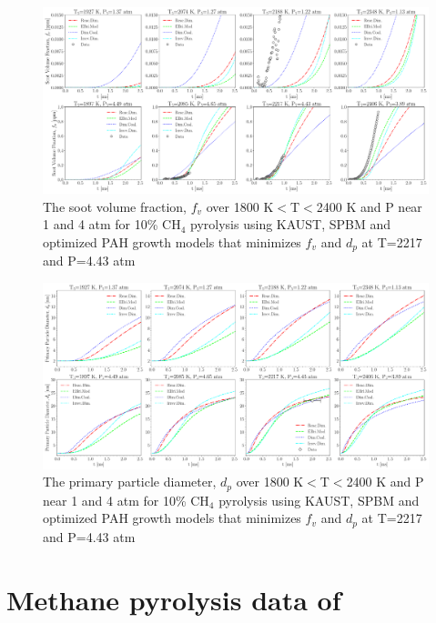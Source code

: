 \begin{figure}[H]
	\centering
	\includegraphics[width=1\textwidth]{Figures/Results/Shocktube/Stanford/September/10CH4_vf_pahopt_all.pdf}
	\caption{The soot volume fraction, $f_v$ over 1800 K$<$T$<$2400 K and P near 1  and 4 atm for 10\% $\mathrm{CH_4}$ pyrolysis using KAUST, SPBM and optimized PAH growth models that minimizes $f_v$ and $d_p$ at T=2217 and P=4.43 atm}
	\label{fig:shocktubest_10ch4_vf_incepopt_all} 
\end{figure}

\begin{figure}[H]
	\centering
	\includegraphics[width=1\textwidth]{Figures/Results/Shocktube/Stanford/September/10CH4_dp_pahopt_all.pdf}
	\caption{The primary particle diameter, $d_p$ over 1800 K$<$T$<$2400 K and P near 1  and 4 atm for 10\% $\mathrm{CH_4}$ pyrolysis using KAUST, SPBM and optimized PAH growth models that minimizes $f_v$ and $d_p$ at T=2217 and P=4.43 atm}
	\label{fig:shocktubest_10ch4_dp_incepopt_all} 
\end{figure}

\section{Methane pyrolysis data of \citet{agafonov2016unified}}

